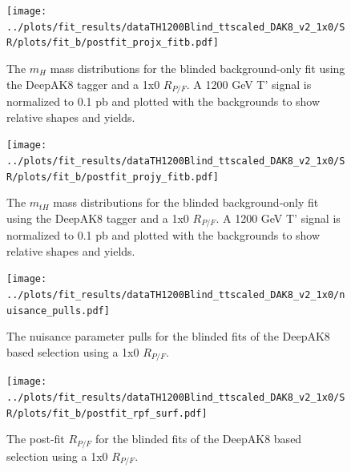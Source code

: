 \documentclass[10pt,oneside]{article}
\begin{document}
\begin{figure}[H]
    \centering
    \texttt{[image: ../plots/fit\_results/dataTH1200Blind\_ttscaled\_DAK8\_v2\_1x0/SR/plots/fit\_b/postfit\_projx\_fitb.pdf]}
    \caption{The $m_H$ mass distributions for the blinded background-only fit using the DeepAK8 tagger and a 1x0 $R_{P/F}$.
    A 1200 GeV T' signal is normalized to 0.1 pb and plotted with the backgrounds to show relative shapes and yields.}
    \label{figs:DAK8_mh_1x0}
\end{figure}
\begin{figure}[H]
    \centering
    \texttt{[image: ../plots/fit\_results/dataTH1200Blind\_ttscaled\_DAK8\_v2\_1x0/SR/plots/fit\_b/postfit\_projy\_fitb.pdf]}
    \caption{The $m_{tH}$ mass distributions for the blinded background-only fit using the DeepAK8 tagger and a 1x0 $R_{P/F}$.
    A 1200 GeV T' signal is normalized to 0.1 pb and plotted with the backgrounds to show relative shapes and yields.}
    \label{figs:DAK8_mth_1x0}
\end{figure}
\begin{figure}[H]
    \centering
    \texttt{[image: ../plots/fit\_results/dataTH1200Blind\_ttscaled\_DAK8\_v2\_1x0/nuisance\_pulls.pdf]}
    \caption{The nuisance parameter pulls for the blinded fits of the DeepAK8 based selection using a 1x0 $R_{P/F}$.}
    \label{figs:DAK8_nuis_1x0}
\end{figure}
\begin{figure}[H]
    \centering
    \texttt{[image: ../plots/fit\_results/dataTH1200Blind\_ttscaled\_DAK8\_v2\_1x0/SR/plots/fit\_b/postfit\_rpf\_surf.pdf]}
    \caption{The post-fit $R_{P/F}$ for the blinded fits of the DeepAK8 based selection using a 1x0 $R_{P/F}$.}
    \label{figs:DAK8_rpf_1x0}
\end{figure}
\end{document}
